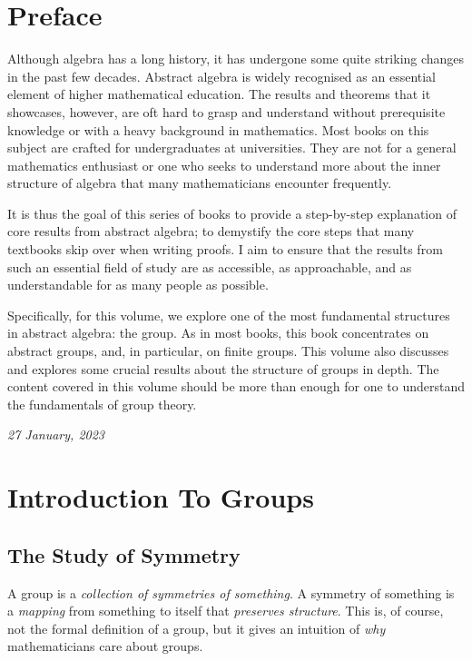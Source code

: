 \chapter*{Preface}
Although algebra has a long history, it has undergone some quite striking changes in the past few decades. Abstract algebra is widely recognised as an essential element of higher mathematical education. The results and theorems that it showcases, however, are oft hard to grasp and understand without prerequisite knowledge or with a heavy background in mathematics. Most books on this subject are crafted for undergraduates at universities. They are not for a general mathematics enthusiast or one who seeks to understand more about the inner structure of algebra that many mathematicians encounter frequently.

It is thus the goal of this series of books to provide a step-by-step explanation of core results from abstract algebra; to demystify the core steps that many textbooks skip over when writing proofs. I aim to ensure that the results from such an essential field of study are as accessible, as approachable, and as understandable for as many people as possible.

Specifically, for this volume, we explore one of the most fundamental structures in abstract algebra: the group. As in most books, this book concentrates on abstract groups, and, in particular, on finite groups. This volume also discusses and explores some crucial results about the structure of groups in depth. The content covered in this volume should be more than enough for one to understand the fundamentals of group theory.

\hfill{\textit{27 January, 2023}}
\newpage

\tableofcontents
\setcounter{part}{1}

\chapter{Introduction To Groups}
\section{The Study of Symmetry}
A group is a \textit{collection of symmetries of something}. A symmetry of something is a \textit{mapping} from something to itself that \textit{preserves structure}. This is, of course, not the formal definition of a group, but it gives an intuition of \textit{why} mathematicians care about groups.

